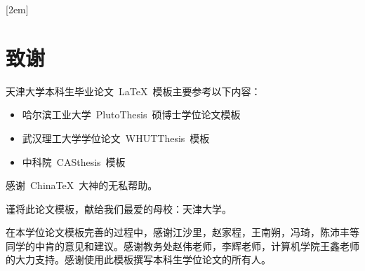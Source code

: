 
[2em]{\vspace{.5\baselineskip}\xiaosan\song}
             {\prechaptername\CJKnumber{\thecontentslabel}\postchaptername\qquad}{} 
             {}                            %
\lhead{}
\rhead{}
\lfoot{}
\cfoot{}
\rfoot{}
\chapter*{致\quad 谢}
\setcounter{page}{1}

天津大学本科生毕业论文~\LaTeX~模板主要参考以下内容：
\begin{itemize}
  \item 哈尔滨工业大学~PlutoThesis~硕博士学位论文模板
  \item 武汉理工大学学位论文~WHUTThesis~模板
  \item 中科院~CASthesis~模板
\end{itemize}

感谢~ChinaTeX~大神的无私帮助。

谨将此论文模板，献给我们最爱的母校：天津大学。

在本学位论文模板完善的过程中，感谢江沙里，赵家程，王南朔，冯琦，陈沛丰等同学的中肯的意见和建议。感谢教务处赵伟老师，李辉老师，计算机学院王鑫老师的大力支持。感谢使用此模板撰写本科生学位论文的所有人。

